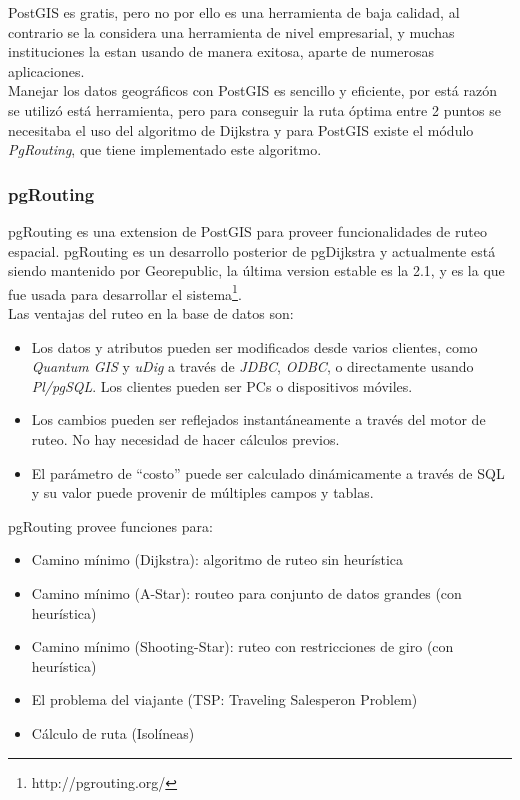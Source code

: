       PostGIS es gratis, pero no por ello es una herramienta de baja calidad, al contrario se la considera una herramienta de nivel empresarial, y muchas instituciones la estan usando de manera exitosa, aparte de numerosas aplicaciones.\\

      Manejar los datos geográficos con PostGIS es sencillo y eficiente, por está raz\'on se utilizó está herramienta, pero para conseguir la ruta óptima entre 2 puntos se necesitaba el uso del algoritmo de Dijkstra y para PostGIS existe el módulo \emph{PgRouting}, que tiene implementado este algoritmo.\\

      \subsubsection{pgRouting} %
      \label{sec:pgrouting}
        pgRouting es una extension  de  PostGIS para proveer funcionalidades de ruteo espacial. pgRouting es un desarrollo posterior de pgDijkstra y actualmente está siendo mantenido por Georepublic, la última version estable es la 2.1, y es la que fue usada para desarrollar el sistema\footnote{http://pgrouting.org/}.\\

        Las ventajas del ruteo en la base de datos son:
        \begin{itemize}
          \item Los datos y atributos pueden ser modificados desde varios clientes, como \emph{Quantum GIS} y \emph{uDig} a través de \emph{JDBC}, \emph{ODBC}, o directamente usando \emph{Pl/pgSQL}. Los clientes pueden ser PCs o dispositivos móviles.
          \item Los cambios pueden ser reflejados instantáneamente a través del motor de ruteo. No hay necesidad de hacer cálculos previos.
          \item El parámetro de ``costo'' puede ser calculado dinámicamente a través de SQL y su valor puede provenir de múltiples campos y tablas.
        \end{itemize}

        pgRouting provee funciones para:
        \begin{itemize}
          \item Camino mínimo (Dijkstra): algoritmo de ruteo sin heurística
          \item Camino mínimo (A-Star): routeo para conjunto de datos grandes (con heurística)
          \item Camino mínimo (Shooting-Star): ruteo con restricciones de giro (con heurística)
          \item El problema del viajante (TSP: Traveling Salesperon Problem)
          \item Cálculo de ruta (Isolíneas)
        \end{itemize}

